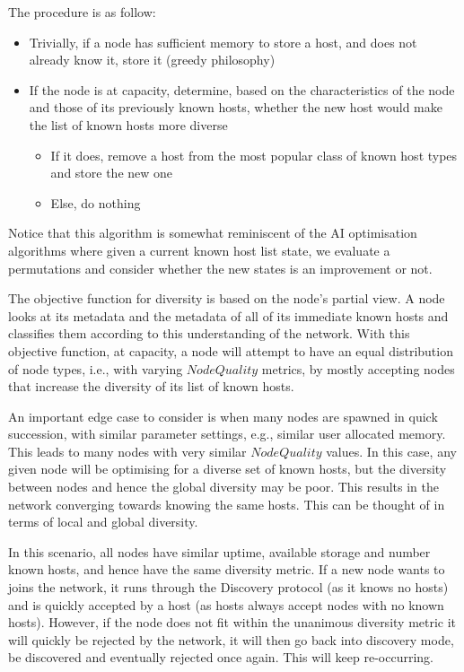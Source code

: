 \noindent The procedure is as follow:
\begin{itemize}
    \item Trivially, if a node has sufficient memory to store a host, and does not already know it, store it (greedy philosophy)
    \item If the node is at capacity, determine, based on the characteristics of the node and those of its previously known hosts, whether the new host would make the list of known hosts more diverse
    \begin{itemize}
        \item If it does, remove a host from the most popular class of known host types and store the new one
        \item Else, do nothing
    \end{itemize}
\end{itemize}

Notice that this algorithm is somewhat reminiscent of the AI optimisation algorithms where given a current known host list state, we evaluate a permutations and consider whether the new states is an improvement or not.

The objective function for diversity is based on the node's partial view. A node looks at its metadata and the metadata of all of its immediate known hosts and classifies them according to this understanding of the network. With this objective function, at capacity, a node will attempt to have an equal distribution of node types, i.e., with varying $NodeQuality$ metrics, by mostly accepting nodes that increase the diversity of its list of known hosts.

An important edge case to consider is when many nodes are spawned in quick succession, with similar parameter settings, e.g., similar user allocated memory. This leads to many nodes with very similar $NodeQuality$ values. In this case, any given node will be optimising for a diverse set of known hosts, but the diversity between nodes and hence the global diversity may be poor. This results in the network converging towards knowing the same hosts. This can be thought of in terms of local and global diversity. %

In this scenario, all nodes have similar uptime, available storage and number known hosts, and hence have the same diversity metric. If a new node wants to joins the network, it runs through the Discovery protocol (as it knows no hosts) and is quickly accepted by a host (as hosts always accept nodes with no known hosts). However, if the node does not fit within the unanimous diversity metric it will quickly be rejected by the network, it will then go back into discovery mode, be discovered and eventually rejected once again. This will keep re-occurring.

